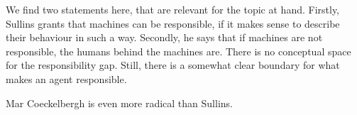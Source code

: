 \documentclass{article}
\begin{document}
We find two statements here, that are relevant for the topic at hand. Firstly,
Sullins grants that machines can be responsible, if it makes sense to describe
their behaviour in such a way. Secondly, he says that if
machines are not responsible, the humans behind the machines are. There is no
conceptual space for the responsibility gap. Still, there is a somewhat clear
boundary for what makes an agent responsible.



Mar Coeckelbergh is even more radical than Sullins.
\end{document}
